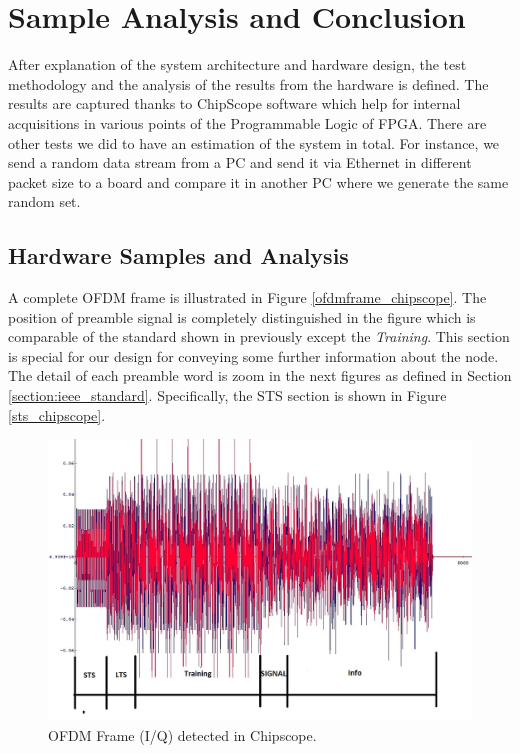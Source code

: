 \chapter{Sample Analysis and Conclusion}
\label{sec:chapter_2}

After explanation of the system architecture and hardware design, the test methodology and the analysis of the results from the hardware is defined. The results are captured thanks to ChipScope software which help for internal acquisitions in various points of the Programmable Logic of FPGA. There are other tests we did to have an estimation of the system in total. For instance, we send a random data stream from a PC and send it via Ethernet in different packet size to a board and compare it in another PC where we generate the same random set.\\

\section{Hardware Samples and Analysis}
\label{hw_samples}

A complete OFDM frame is illustrated in Figure \ref{ofdmframe_chipscope}. The position of preamble signal is completely distinguished in the figure which is comparable of the standard shown in previously except the \textit{Training}. This section is special for our design for conveying some further information about the node. The detail of each preamble word is zoom in the next figures as defined in Section \ref{section:ieee_standard}. Specifically, the STS section is shown in Figure \ref{sts_chipscope}.\\
\begin{figure}
\includegraphics[width=\textwidth]{content/fig/ofdmframe_chipscope.JPG}
\caption{OFDM Frame (I/Q) detected in Chipscope.}
\label{fig:ofdmframe_chipscope}
\end{figure}

